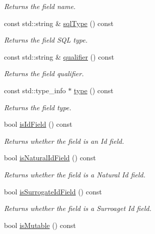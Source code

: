 \begin{DoxyCompactItemize}
\begin{DoxyCompactList}\small\item\em Returns the field name. \end{DoxyCompactList}\item 
const std\+::string \& \hyperlink{classdbo_1_1mapping_1_1_field_info_a29f7e7f762345f1915033a9a456cd5d0}{sql\+Type} () const 
\begin{DoxyCompactList}\small\item\em Returns the field S\+Q\+L type. \end{DoxyCompactList}\item 
const std\+::string \& \hyperlink{classdbo_1_1mapping_1_1_field_info_a3891d63e2efd86128fd6f6ae10979b22}{qualifier} () const 
\begin{DoxyCompactList}\small\item\em Returns the field qualifier. \end{DoxyCompactList}\item 
const std\+::type\+\_\+info $\ast$ \hyperlink{classdbo_1_1mapping_1_1_field_info_a4321bb42c7c9d8296db5180b94a736f6}{type} () const 
\begin{DoxyCompactList}\small\item\em Returns the field type. \end{DoxyCompactList}\item 
bool \hyperlink{classdbo_1_1mapping_1_1_field_info_a1dce2395f113563a2525d7e1d150245d}{is\+Id\+Field} () const 
\begin{DoxyCompactList}\small\item\em Returns whether the field is an Id field. \end{DoxyCompactList}\item 
bool \hyperlink{classdbo_1_1mapping_1_1_field_info_a37ca3f6a5116fcc0afe4ea113dafe07a}{is\+Natural\+Id\+Field} () const 
\begin{DoxyCompactList}\small\item\em Returns whether the field is a Natural Id field. \end{DoxyCompactList}\item 
bool \hyperlink{classdbo_1_1mapping_1_1_field_info_a985286424bae56da1b84d3d1c1dcd128}{is\+Surrogate\+Id\+Field} () const 
\begin{DoxyCompactList}\small\item\em Returns whether the field is a Surroaget Id field. \end{DoxyCompactList}\item 
bool \hyperlink{classdbo_1_1mapping_1_1_field_info_aba30a705ddc3779e976ad2014fc19fbf}{is\+Mutable} () const 

\end{DoxyCompactItemize}
